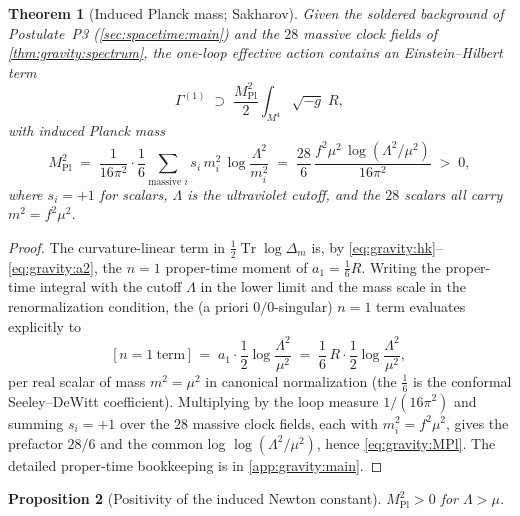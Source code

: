\documentclass[11pt]{article}
\theoremstyle{plain}
\newtheorem{theorem}{Theorem}[section]
\newtheorem{proposition}[theorem]{Proposition}
\theoremstyle{definition}
\theoremstyle{remark}
\newcommand{\Tr}{\operatorname{Tr}}
\begin{document}
\begin{theorem}[Induced Planck mass; Sakharov]
\label{thm:gravity:planck}
\label{thm:gravity:MPl}
\label{thm:GravitySummary}
Given the soldered background of Postulate~P3 (\autoref{sec:spacetime:main})
and the $28$ massive clock fields of \autoref{thm:gravity:spectrum}, the
one-loop effective action contains an Einstein--Hilbert term
\begin{equation}\label{eq:gravity:EH}
  \Gamma^{(1)} \;\supset\;
  \frac{M_{\mathrm{Pl}}^{2}}{2}\int_{M^{4}}\!\sqrt{-g}\;R,
\end{equation}
with induced Planck mass
\begin{equation}\label{eq:gravity:MPl}
  M_{\mathrm{Pl}}^{2}
  \;=\;
  \frac{1}{16\pi^{2}}\cdot\frac{1}{6}
  \sum_{\text{massive } i} s_{i}\, m_{i}^{2}\,\log\frac{\Lambda^{2}}{m_{i}^{2}}
  \;=\;
  \frac{28}{6}\,
  \frac{f^{2}\mu^{2}\,\log(\Lambda^{2}/\mu^{2})}{16\pi^{2}}
  \;>\; 0 ,
\end{equation}
where $s_{i}=+1$ for scalars, $\Lambda$ is the ultraviolet cutoff, and the
$28$ scalars all carry $m^{2}=f^{2}\mu^{2}$.
\end{theorem}

\begin{proof}
The curvature-linear term in $\tfrac12\Tr\log\Delta_{m}$ is, by
\eqref{eq:gravity:hk}--\eqref{eq:gravity:a2}, the $n=1$ proper-time moment
of $a_{1}=\tfrac16 R$. Writing the proper-time integral with the cutoff
$\Lambda$ in the lower limit and the mass scale in the renormalization
condition, the (a priori $0/0$-singular) $n=1$ term evaluates explicitly to
\begin{equation}\label{eq:gravity:n1}
  \bigl[\,n=1\ \text{term}\,\bigr]
  \;=\;
  a_{1}\cdot\frac12\log\frac{\Lambda^{2}}{\mu^{2}}
  \;=\;
  \frac{1}{6}\,R\cdot\frac12\log\frac{\Lambda^{2}}{\mu^{2}},
\end{equation}
per real scalar of mass $m^{2}=\mu^{2}$ in canonical normalization (the
$\tfrac16$ is the conformal Seeley--DeWitt coefficient). Multiplying by the
loop measure $1/(16\pi^{2})$ and summing $s_{i}=+1$ over the $28$ massive
clock fields, each with $m_{i}^{2}=f^{2}\mu^{2}$, gives the prefactor
$28/6$ and the common log $\log(\Lambda^{2}/\mu^{2})$, hence
\eqref{eq:gravity:MPl}. The detailed proper-time bookkeeping is in
\autoref{app:gravity:main}.
\end{proof}

\begin{proposition}[Positivity of the induced Newton constant]
\label{prop:gravity:positivity}
$M_{\mathrm{Pl}}^{2}>0$ for $\Lambda>\mu$.
\end{proposition}
\end{document}
